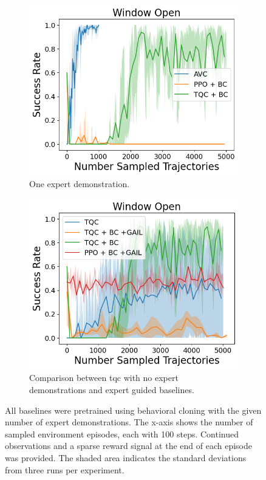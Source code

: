 \begin{figure}[htbp]
\begin{subfigure}[t]{0.45\textwidth}
    \includegraphics[width=\textwidth]{images/dense_1/Window Open.png}
    \caption{One expert demonstration.}
  \end{subfigure}
  \hfill
  \begin{subfigure}[t]{0.45\textwidth}
    \includegraphics[width=\textwidth]{images/TQC_bc_GAIL_vs_ref/Window Open.png}
    \caption{Comparison between \ac{tqc} with no expert demonstrations and expert guided baselines.}
    \label{fig:TQC_0_vs_exp}
  \end{subfigure}
  \caption{All baselines were pretrained using behavioral cloning with the given number of expert demonstrations. 
    The x-axis shows the number of sampled environment episodes, each with 100 steps. 
    Continued observations and a sparse reward signal at the end of each episode was provided. 
    The shaded area indicates the standard deviations from three runs per experiment.}
    \label{fig:dense_ref}
\end{figure}

